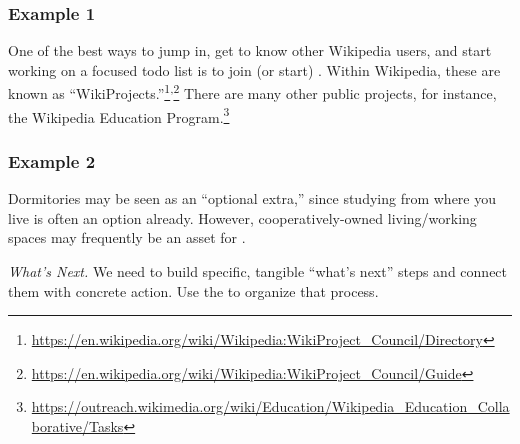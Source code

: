 \subsubsection*{Example 1}
One of the best ways to jump in, get to know other Wikipedia users,
and start working on a focused todo list is to join (or start)
.  Within Wikipedia, these are known
as
``WikiProjects.''\footnote{\url{https://en.wikipedia.org/wiki/Wikipedia:WikiProject_Council/Directory}}\textsuperscript{,}\footnote{\url{https://en.wikipedia.org/wiki/Wikipedia:WikiProject_Council/Guide}}
There are many other public projects, for instance, the Wikipedia
Education
Program.\footnote{\url{https://outreach.wikimedia.org/wiki/Education/Wikipedia_Education_Collaborative/Tasks}}

\subsubsection*{Example 2}
Dormitories may be seen as an ``optional extra,'' since studying from
where you live is often an option already.  However,
cooperatively-owned living/working spaces may frequently be an asset
for .


\begin{framed}
\noindent 
\emph{What's Next.}
We need to build specific, tangible ``what's next'' steps and connect them with concrete action. Use the  to organize that process. 
\end{framed}

